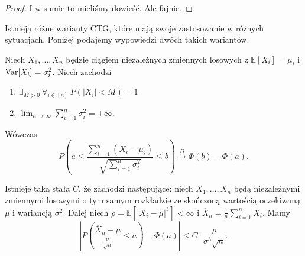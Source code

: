 \begin{proof}
	I w sumie to mieliśmy dowieść. Ale fajnie.
\end{proof}

Istnieją różne warianty CTG, które mają swoje zastosowanie w różnych sytuacjach. Poniżej podajemy wypowiedzi dwóch takich wariantów.

\begin{theorem}
	Niech \(X_1,\ldots,X_n\) będzie ciągiem niezależnych zmiennych losowych z \(\mathbb{E}\left[ X_i \right] = \mu_i\) i \(\variance{X_i} = \sigma_i^2\). Niech zachodzi
	\begin{enumerate}
		\item \(\exists_{M>0} \ \forall_{i \in [n]} \ P\left( \left|X_i\right|<M \right) = 1 \)
		\item \( \lim_{n \to \infty} \sum_{i=1}^{n} \sigma_i^2 = +\infty\).
	\end{enumerate}
	Wówczas \[ P\left( a \le \frac{ \sum_{i=1}^{n} \left( X_i - \mu_i \right) }{\sqrt{ \sum_{i=1}^{n} \sigma_i^2} } \le  b  \right) \xrightarrow{D} \Phi\left( b  \right) - \Phi\left( a  \right) . \]
\end{theorem}

\begin{theorem}
	Istnieje taka stała \(C\), że zachodzi następujące: niech \(X_1,\ldots,X_n\) będą niezależnymi zmiennymi losowymi o tym samym rozkładzie ze skończoną wartością oczekiwaną \(\mu\) i wariancją \(\sigma^2\). Dalej niech \(\rho = \mathbb{E}\left[ \left|X_i-\mu\right|^3 \right] < \infty \) i \(\overline{X}_{n} = \frac{1}{n} \sum_{i=1}^{n} X_i\). Mamy
	\[ \left|P\left( \frac{\overline{X}_{n}-\mu}{\frac{\sigma}{\sqrt{n} }} \le a \right) - \Phi\left( a  \right) \right| \le C\cdot \frac{\rho}{\sigma^3 \sqrt{n} } .\]
\end{theorem}

